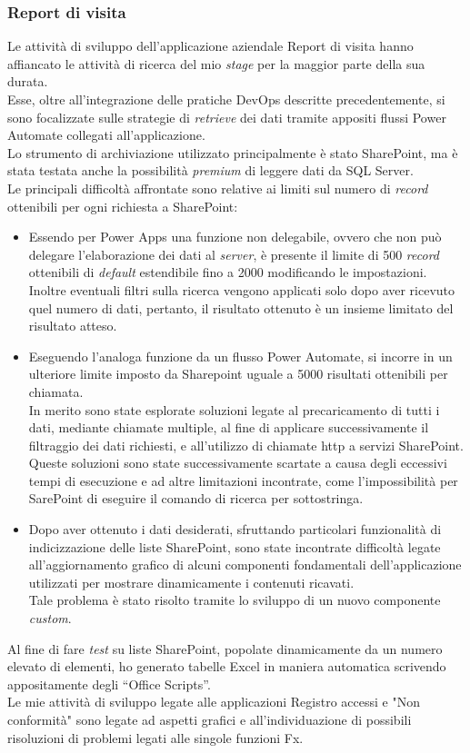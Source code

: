 \subsubsection*{Report di visita}
Le attività di sviluppo dell'applicazione aziendale Report di visita hanno affiancato le attività di ricerca del mio \emph{stage} per la maggior parte della sua durata.\\
Esse, oltre all'integrazione delle pratiche \gls{DevOps} descritte precedentemente, si sono focalizzate sulle strategie di \emph{retrieve} dei dati tramite appositi flussi Power Automate collegati all'applicazione.\\
Lo strumento di archiviazione utilizzato principalmente è stato SharePoint, ma è stata testata anche la possibilità \emph{premium} di leggere dati da SQL Server.\\
Le principali difficoltà affrontate sono relative ai limiti sul numero di \emph{record} ottenibili per ogni richiesta a SharePoint:
\begin{itemize}
    \item Essendo per Power Apps una funzione non delegabile, ovvero che non può delegare l'elaborazione dei dati al \emph{server}, è presente il limite di 500 \emph{record} ottenibili di \emph{default} estendibile fino a 2000 modificando le impostazioni. Inoltre eventuali filtri sulla ricerca vengono applicati solo dopo aver ricevuto quel numero di dati, pertanto, il risultato ottenuto è un insieme limitato del risultato atteso.
    \item Eseguendo l'analoga funzione da un flusso Power Automate, si incorre in un ulteriore limite imposto da Sharepoint uguale a 5000 risultati ottenibili per chiamata.\\
    In merito sono state esplorate soluzioni legate al precaricamento di tutti i dati, mediante chiamate multiple, al fine di applicare successivamente il filtraggio dei dati richiesti, e all'utilizzo di chiamate \gls{http} a servizi SharePoint. Queste soluzioni sono state successivamente scartate a causa degli eccessivi tempi di esecuzione e ad altre limitazioni incontrate, come l'impossibilità per SarePoint di eseguire il comando di ricerca per sottostringa.
    \item Dopo aver ottenuto i dati desiderati, sfruttando particolari funzionalità di indicizzazione delle liste SharePoint, sono state incontrate difficoltà legate all'aggiornamento grafico di alcuni componenti fondamentali dell'applicazione utilizzati per mostrare dinamicamente i contenuti ricavati.\\
    Tale problema è stato risolto tramite lo sviluppo di un nuovo componente \emph{custom}.  
\end{itemize}
Al fine di fare \emph{test} su liste SharePoint, popolate dinamicamente da un numero elevato di elementi, ho generato tabelle Excel in maniera automatica scrivendo appositamente degli “Office Scripts”.\\
Le mie attività di sviluppo legate alle applicazioni Registro accessi e "Non conformità" sono legate ad aspetti grafici e all'individuazione di possibili risoluzioni di problemi legati alle singole funzioni Fx. 

